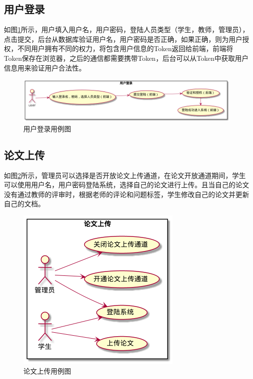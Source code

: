 \subsection{用户登录}

如图\ref{login-usecase}所示，用户填入用户名，用户密码，登陆人员类型（学生，教师，管理员），点击提交，后台从数据库验证用户名，用户密码是否正确，如果正确，则为用户授权，不同用户拥有不同的权力，将包含用户信息的Token返回给前端，前端将Token保存在浏览器，之后的通信都需要携带Token，后台可以从Token中获取用户信息用来验证用户合法性。

\begin{figure}[htbp]
	\centering
	\includegraphics[scale = 0.45]{out/uml/用例图/1-用户登录用例图/1-用户登录用例图.png}
	\caption{\song\wuhao 用户登录用例图}
	\label{login-usecase}
\end{figure}

\subsection{论文上传}

如图\ref{upload-usecase}所示，管理员可以选择是否开放论文上传通道，在论文开放通道期间，学生可以使用用户名，用户密码登陆系统，选择自己的论文进行上传。且当自己的论文没有通过教师的评审时，根据老师的评论和问题标签，学生修改自己的论文并更新自己的文档。

\begin{figure}[htbp]
	\centering
	\includegraphics[scale = 0.6]{out/uml/用例图/2-论文上传/2-论文上传.png}
	\caption{\song\wuhao 论文上传用例图}
	\label{upload-usecase}
\end{figure}

